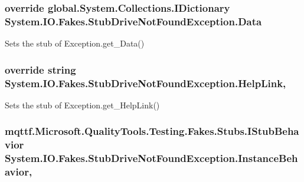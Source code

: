\hypertarget{class_system_1_1_i_o_1_1_fakes_1_1_stub_drive_not_found_exception_ad3a92deec390242ee36b5f227ac95c2b}{
\subsubsection[{Data}]{\setlength{\rightskip}{0pt plus 5cm}override global.\-System.\-Collections.\-I\-Dictionary System.\-I\-O.\-Fakes.\-Stub\-Drive\-Not\-Found\-Exception.\-Data\hspace{0.3cm}{\ttfamily [get]}}}\label{class_system_1_1_i_o_1_1_fakes_1_1_stub_drive_not_found_exception_ad3a92deec390242ee36b5f227ac95c2b}


Sets the stub of Exception.\-get\-\_\-\-Data()

\hypertarget{class_system_1_1_i_o_1_1_fakes_1_1_stub_drive_not_found_exception_a8060506c31998837d625258ac53df388}{
\subsubsection[{Help\-Link}]{\setlength{\rightskip}{0pt plus 5cm}override string System.\-I\-O.\-Fakes.\-Stub\-Drive\-Not\-Found\-Exception.\-Help\-Link\hspace{0.3cm}{\ttfamily [get]}, {\ttfamily [set]}}}\label{class_system_1_1_i_o_1_1_fakes_1_1_stub_drive_not_found_exception_a8060506c31998837d625258ac53df388}


Sets the stub of Exception.\-get\-\_\-\-Help\-Link()

\hypertarget{class_system_1_1_i_o_1_1_fakes_1_1_stub_drive_not_found_exception_a1f9130d57f6e7ea9a8c32c5536cfd764}{
\subsubsection[{Instance\-Behavior}]{\setlength{\rightskip}{0pt plus 5cm}mqttf.\-Microsoft.\-Quality\-Tools.\-Testing.\-Fakes.\-Stubs.\-I\-Stub\-Behavior System.\-I\-O.\-Fakes.\-Stub\-Drive\-Not\-Found\-Exception.\-Instance\-Behavior\hspace{0.3cm}{\ttfamily [get]}, {\ttfamily [set]}}}\label{class_system_1_1_i_o_1_1_fakes_1_1_stub_drive_not_found_exception_a1f9130d57f6e7ea9a8c32c5536cfd764}



